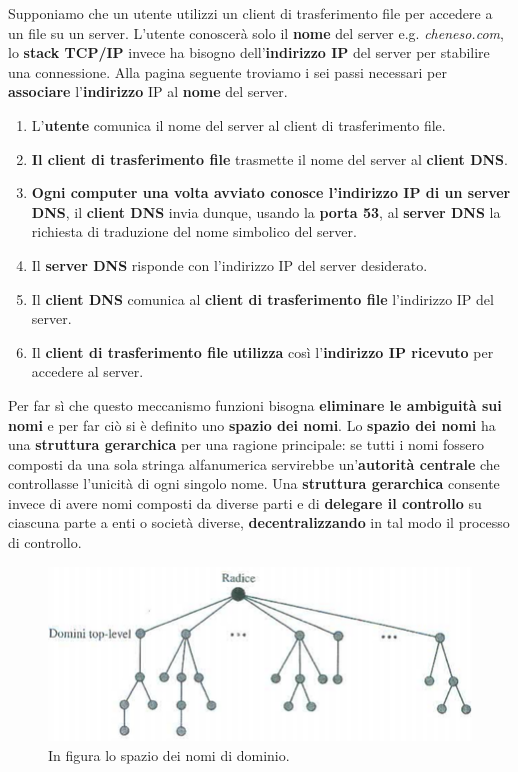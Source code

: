 \documentclass[11pt,a4paper]{article}
\theoremstyle{definition}
\begin{document}
Supponiamo che un utente utilizzi un client di trasferimento file per accedere a un file su un server. L'utente conoscerà solo il \textbf{nome} del server e.g. \textit{cheneso.com}, lo \textbf{stack TCP/IP} invece ha bisogno dell'\textbf{indirizzo IP} del server per stabilire una connessione. Alla pagina seguente troviamo i sei passi necessari per \textbf{associare} l'\textbf{indirizzo} IP al \textbf{nome} del server.
\newpage
\begin{enumerate}
	\item L'\textbf{utente} comunica il nome del server al client di trasferimento file.
	\item \textbf{Il client di trasferimento file} trasmette il nome del server al \textbf{client DNS}.
	\item \textbf{Ogni computer una volta avviato conosce l'indirizzo IP di un server DNS}, il \textbf{client DNS} invia dunque, usando la \textbf{porta 53}, al \textbf{server DNS} la richiesta di traduzione del nome simbolico del server.
	\item Il \textbf{server DNS} risponde con l'indirizzo IP del server desiderato.
	\item Il \textbf{client DNS} comunica al \textbf{client di trasferimento file} l'indirizzo IP del server.
	\item Il \textbf{client di trasferimento file} \textbf{utilizza} così l'\textbf{indirizzo IP ricevuto} per accedere al server.
\end{enumerate}
Per far sì che questo meccanismo funzioni bisogna \textbf{eliminare le ambiguità sui nomi} e per far ciò si è definito uno \textbf{spazio dei nomi}. Lo \textbf{spazio dei nomi} ha una \textbf{struttura gerarchica} per una ragione principale: se tutti i nomi fossero composti da una sola stringa alfanumerica servirebbe un'\textbf{autorità centrale} che controllasse l'unicità di ogni singolo nome. Una \textbf{struttura gerarchica} consente invece di avere nomi composti da diverse parti e di \textbf{delegare il controllo} su ciascuna parte a enti o società diverse, \textbf{decentralizzando} in tal modo il processo di controllo.
\begin{figure}[!h]
	\includegraphics[scale=0.7]{Immagini/DNSpace.png}
	\centering
	\caption{In figura lo spazio dei nomi di dominio.}
\end{figure}\newline
\end{document}
